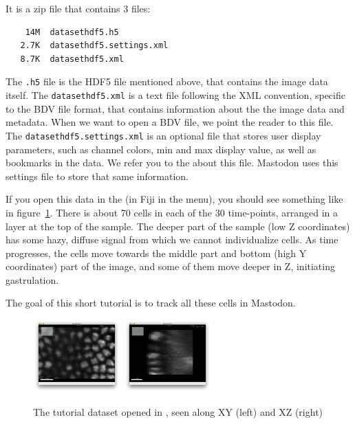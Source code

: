 It is a zip file that contains 3 files:
\begin{verbatim}
    14M  datasethdf5.h5
   2.7K  datasethdf5.settings.xml
   8.7K  datasethdf5.xml
\end{verbatim}

The \texttt{.h5} file is the HDF5 file mentioned above, that contains the image data itself.
The \texttt{data\-sethdf5.xml} is a text file following the XML convention, specific to the BDV file format, that contains information about the the image data and metadata. 
When we want to open a BDV file, we point the reader to this file.
The \texttt{datasethdf5.settings.xml} is an optional file that stores user display parameters, such as channel colors, min and max display value, as well as bookmarks in the data. 
We refer you to the  about this file.
Mastodon uses this settings file to store that same information.

If you open this data in the \Bdv (in Fiji in the  menu), you should see something like in figure~\ref{fig:OpeningImage}. 
There is about 70 cells in each of the 30 time-points, arranged in a layer at the top of the sample. 
The deeper part of the sample (low Z coordinates) has some hazy, diffuse signal from which we cannot individualize cells.
As time progresses, the cells move towards the middle part and bottom (high Y coordinates) part of the image, and some of them move deeper in Z, initiating gastrulation.

The goal of this short tutorial is to track all these cells in Mastodon.

\begin{figure}
     \centering
         \includegraphics[width=0.3\textwidth]{figures/BDV-imageXY.png}
         \includegraphics[width=0.3\textwidth]{figures/BDV-imageXZ.png}
         \caption{The tutorial dataset opened in \Bdv, seen along XY (left) and XZ (right)}
     \label{fig:OpeningImage}
\end{figure}  




